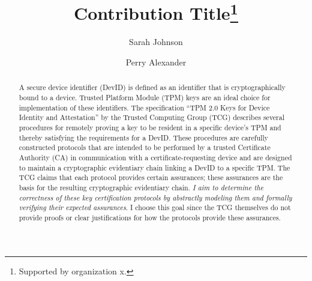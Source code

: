 \documentclass[runningheads]{llncs}
\begin{document}
%
\title{Contribution Title\thanks{Supported by organization x.}}
%
%
\author{Sarah Johnson \and
Perry Alexander}
%
%
%
\maketitle              %
%
\begin{abstract}
A secure device identifier (DevID) is defined as an identifier that is cryptographically bound to a device. Trusted Platform Module (TPM) keys are an ideal choice for implementation of these identifiers.
The specification ``TPM 2.0 Keys for Device Identity and Attestation'' by the Trusted Computing Group (TCG) describes several procedures for remotely proving a key to be resident in a specific device's TPM and thereby satisfying the requirements for a DevID. These procedures are carefully constructed protocols that are intended to be performed by a trusted Certificate Authority (CA) in communication with a certificate-requesting device and are designed to maintain a cryptographic evidentiary chain linking a DevID to a specific TPM. The TCG claims that each protocol provides certain assurances; these assurances are the basis for the resulting cryptographic evidentiary chain. 
\textit{I aim to determine the correctness of these key certification protocols by abstractly modeling them and formally verifying their expected assurances}. I choose this goal since the TCG themselves do not provide proofs or clear justifications for how the protocols provide these assurances. 

\end{abstract}
%
%
%
\end{document}
